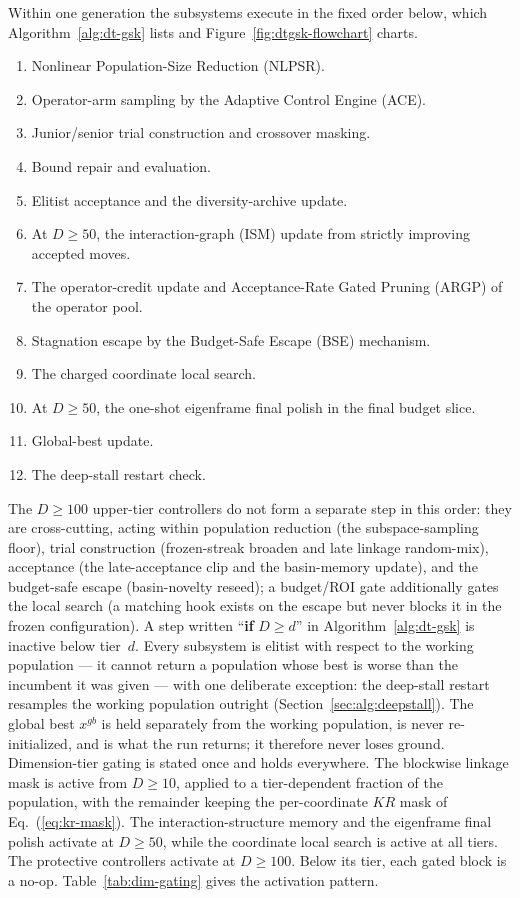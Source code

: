 Within one generation the subsystems execute in the fixed order below,
which Algorithm~\ref{alg:dt-gsk} lists and
Figure~\ref{fig:dtgsk-flowchart} charts.
\begin{enumerate}[noitemsep,topsep=2pt,leftmargin=*,label=(\arabic*)]
\item Nonlinear Population-Size Reduction (NLPSR).
\item Operator-arm sampling by the Adaptive Control Engine (ACE).
\item Junior/senior trial construction and crossover masking.
\item Bound repair and evaluation.
\item Elitist acceptance and the diversity-archive update.
\item At $D\ge50$, the interaction-graph (ISM) update from strictly improving accepted moves.
\item The operator-credit update and Acceptance-Rate Gated Pruning (ARGP)
of the operator pool.
\item Stagnation escape by the Budget-Safe Escape (BSE) mechanism.
\item The charged coordinate local search.
\item At $D\ge50$, the one-shot eigenframe final polish in the final
budget slice.
\item Global-best update.
\item The deep-stall restart check.
\end{enumerate}
The $D\ge100$ upper-tier controllers do not form a separate step in this order: they are cross-cutting, acting within population reduction (the subspace-sampling floor), trial construction (frozen-streak broaden and late linkage random-mix), acceptance (the late-acceptance clip and the basin-memory update), and the budget-safe escape (basin-novelty reseed); a budget/ROI gate additionally gates the local search (a matching hook exists on the escape but never blocks it in the frozen configuration).
A step written ``\textbf{if} $D\ge d$'' in Algorithm~\ref{alg:dt-gsk} is
inactive below tier~$d$. Every subsystem is elitist with respect to the
working population --- it cannot return a population whose best is worse
than the incumbent it was given --- with one deliberate exception: the
deep-stall restart resamples the working population outright
(Section~\ref{sec:alg:deepstall}). The global best $x^{gb}$ is held
separately from the working population, is never re-initialized, and is
what the run returns; it therefore never loses ground.
Dimension-tier gating is stated once and holds everywhere.
The blockwise linkage mask is active from $D\ge10$, applied to a
tier-dependent fraction of the population, with the remainder keeping
the per-coordinate $KR$ mask of Eq.~(\ref{eq:kr-mask}).
The interaction-structure memory and the
eigenframe final polish activate at $D\ge50$, while the coordinate local search
is active at all tiers. The protective
controllers activate at $D\ge100$. %
Below its tier, each gated block is a no-op.
Table~\ref{tab:dim-gating} gives the activation pattern.

